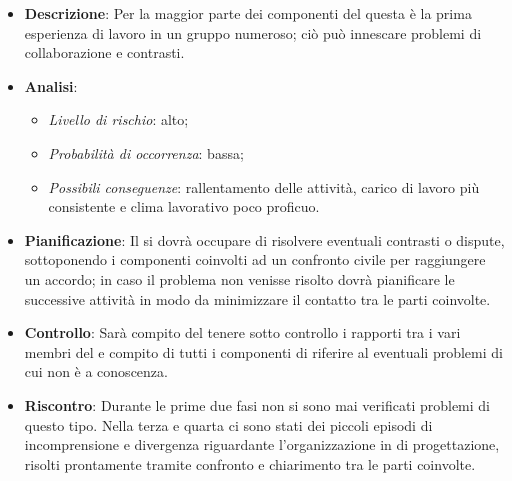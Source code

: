 			\begin{itemize}
				\item \textbf{Descrizione}: Per la maggior parte dei componenti del  questa è la prima esperienza di lavoro in un gruppo numeroso; ciò può  innescare problemi di collaborazione e contrasti.
				\item \textbf{Analisi}:
				\begin{itemize}
					\item \textit{Livello di rischio}: alto;
					\item \textit{Probabilità di occorrenza}: bassa;
					\item \textit{Possibili conseguenze}: rallentamento delle attività, carico di lavoro più consistente e clima lavorativo poco proficuo.
				\end{itemize}
				\item \textbf{Pianificazione}: Il  si dovrà occupare di risolvere eventuali contrasti o dispute, sottoponendo i componenti coinvolti ad un confronto civile per raggiungere un accordo; in caso il problema non venisse risolto dovrà pianificare le successive attività in modo da minimizzare il contatto tra le parti coinvolte.
				\item \textbf{Controllo}: Sarà compito del  tenere sotto controllo i rapporti tra i vari membri del  e compito di tutti i componenti di riferire al  eventuali problemi di cui non è a conoscenza.
				\item \textbf{Riscontro}: Durante le prime due fasi non si sono mai verificati problemi di questo tipo. Nella terza e quarta  ci sono stati dei piccoli episodi di incomprensione e divergenza riguardante l’organizzazione in  di progettazione, risolti prontamente tramite confronto e chiarimento tra le parti coinvolte.
			\end{itemize}
